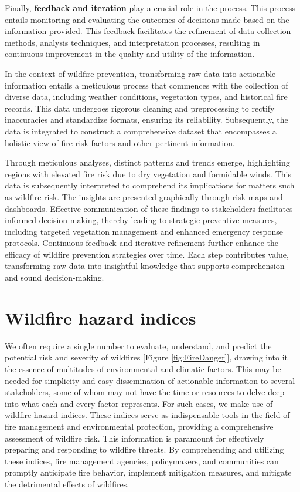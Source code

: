 \documentclass[
  12 pt,
]{Nemilov}
\begin{document}
Finally, \textbf{feedback and iteration} play a crucial role in the process. This process entails monitoring and evaluating the outcomes of decisions made based on the information provided. This feedback facilitates the refinement of data collection methods, analysis techniques, and interpretation processes, resulting in continuous improvement in the quality and utility of the information.

In the context of wildfire prevention, transforming raw data into actionable information entails a meticulous process that commences with the collection of diverse data, including weather conditions, vegetation types, and historical fire records. This data undergoes rigorous cleaning and preprocessing to rectify inaccuracies and standardize formats, ensuring its reliability. Subsequently, the data is integrated to construct a comprehensive dataset that encompasses a holistic view of fire risk factors and other pertinent information.

Through meticulous analyses, distinct patterns and trends emerge, highlighting regions with elevated fire risk due to dry vegetation and formidable winds. This data is subsequently interpreted to comprehend its implications for matters such as wildfire risk. The insights are presented graphically through risk maps and dashboards. Effective communication of these findings to stakeholders facilitates informed decision-making, thereby leading to strategic preventive measures, including targeted vegetation management and enhanced emergency response protocols. Continuous feedback and iterative refinement further enhance the efficacy of wildfire prevention strategies over time. Each step contributes value, transforming raw data into insightful knowledge that supports comprehension and sound decision-making.

\section{Wildfire hazard indices}\label{wildfire-hazard-indices}

We often require a single number to evaluate, understand, and predict the potential risk and severity of wildfires {[}Figure \ref{fig:FireDanger}{]}, drawing into it the essence of multitudes of environmental and climatic factors. This may be needed for simplicity and easy dissemination of actionable information to several stakeholders, some of whom may not have the time or resources to delve deep into what each and every factor represents. For such cases, we make use of wildfire hazard indices. These indices serve as indispensable tools in the field of fire management and environmental protection, providing a comprehensive assessment of wildfire risk. This information is paramount for effectively preparing and responding to wildfire threats. By comprehending and utilizing these indices, fire management agencies, policymakers, and communities can promptly anticipate fire behavior, implement mitigation measures, and mitigate the detrimental effects of wildfires.
\end{document}
